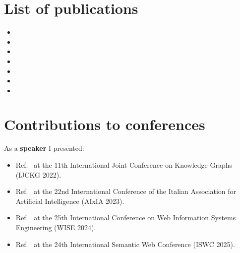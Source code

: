 \begin{abstract}
Together, the contributions represent an integrated approach for information access in knowledge-intensive legal settings. The designed entity-centric \acl{dia} integrates the knowledge received from extraction services and can be paired with \aclp{ui} or  to support downstream use cases, while preserving traceability, verifiability, and error-correction capability in line with the GDPR and AI Act requirements on data control and human oversight.



\end{abstract}



\clearpage
\section*{List of publications}
\begin{itemize}
  \item {}
  \item {}
  \item {}
  \item {}
  \item {}
  \item {}
  \item {}
\end{itemize}
\clearpage

\section*{Contributions to conferences}
As a \textbf{speaker} I presented:
\begin{itemize}
	\item Ref.~\cite{ijckg2022} at the 11th International Joint Conference on Knowledge Graphs (IJCKG 2022).
	\item Ref.~\cite{aixia_2023} at the 22nd International Conference of the Italian Association for Artificial Intelligence (AIxIA 2023).
	\item Ref.~\cite{pozzi_wise_2025} at the 25th International Conference on Web Information Systems Engineering (WISE 2024).
	\item Ref.~\cite{Pozzi2025ReFactX} at the 24th International Semantic Web Conference (ISWC 2025).
\end{itemize}

